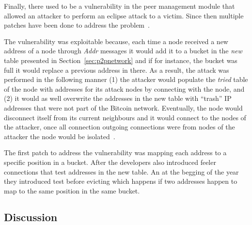 Finally, there used to be a vulnerability in the peer management module that allowed an attacker to perform an eclipse attack to a victim. Since then multiple patches have been done to address the problem~\cite{bojja2017dandelion}.

The vulnerability was exploitable because, each time a node received a new address of a node through \textsl{Addr} messages it would add it to a bucket in the \textsl{new} table presented in Section~\ref{sec:p2pnetwork} and if for instance, the bucket was full it would replace a previous address in there. As a result, the attack was performed in the following manner (1) the attacker would populate the \emph{tried} table of the node with addresses for its attack nodes by connecting with the node, and (2) it would as well overwrite the addresses in the new table with “trash” IP addresses that were not part of the Bitcoin network. Eventually, the node would disconnect itself from its current neighbours and it would connect to the nodes of the attacker, once all connection outgoing connections were from nodes of the attacker the node would be isolated~\cite{bojja2017dandelion}.

The first patch to address the vulnerability was mapping each address to a specific position in a bucket. After the developers also introduced feeler connections that test addresses in the new table. An at the begging of the year they introduced test before evicting which happens if two addresses happen to map to the same position in the same bucket.

\subsection{Discussion}

